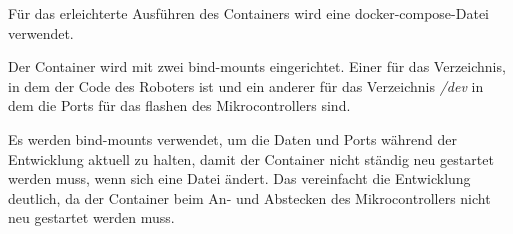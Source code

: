 \begin{flushleft}
    Für das erleichterte Ausführen des Containers wird eine docker-compose-Datei verwendet.

    Der Container wird mit zwei bind-mounts eingerichtet. Einer für das Verzeichnis, 
    in dem der Code des Roboters ist und ein anderer für das Verzeichnis \textit{/dev} in dem die Ports für das flashen des Mikrocontrollers sind.

    Es werden bind-mounts verwendet, um die Daten und Ports während der Entwicklung aktuell zu halten, damit der Container nicht ständig neu gestartet werden muss, wenn sich eine Datei ändert.
    Das vereinfacht die Entwicklung deutlich, da der Container beim An- und Abstecken des Mikrocontrollers nicht neu gestartet werden muss. 
    
\end{flushleft}
